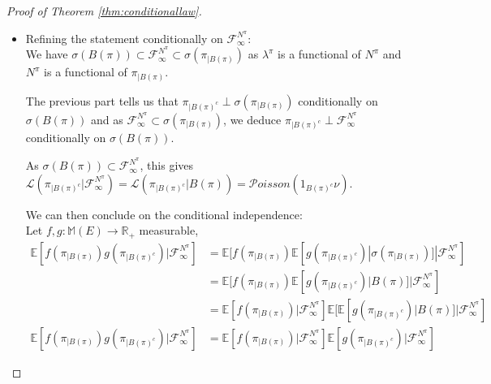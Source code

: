 \documentclass{article} %
\newcommand{\1}{\mathbbm{1}} %
\newcommand{\E}{\mathbb{E}}
\newcommand{\R}{\mathbb{R}}
\begin{document}
\begin{as}
\begin{proof}[Proof of Theorem \ref{thm:conditionallaw}]
\begin{itemize}
            This provides the conditional expectation $\E[f(\pi_{|B(\pi)})g(\pi_{|B(\pi)^c})|\sigma(B(\pi))] = \E[f(\pi_{|B(\pi)}) g(\pi'_{|B(\pi)^c})|\sigma(B(\pi))]$.

            $\pi_{|B(\pi)}$ and $\pi_{|B(\pi)^c}$ are thus independent conditionally on $B(\pi)$ and as $\pi, \pi'$ are independent, $\mathcal{L}(\pi_{|B(\pi)^c}|B(\pi)) = \mathcal{L}(\pi'_{|B(\pi)^c}|B(\pi)) = \mathcal{P}oisson(1_{B(\pi)^c} \nu)$.

            \item Refining the statement conditionally on $\mathcal{F}^{N^\pi}_\infty$:\\
            We have $\sigma(B(\pi)) \subset \mathcal{F}^{N^\pi}_\infty \subset \sigma(\pi_{|B(\pi)})$ as $\lambda^\pi$ is a functional of $N^\pi$ and $N^\pi$ is a functional of $\pi_{|B(\pi)}$.

            The previous part tells us that $\pi_{|B(\pi)^c} \perp \sigma(\pi_{|B(\pi)})$ conditionally on $\sigma(B(\pi))$ and as $\mathcal{F}^{N^\pi}_\infty \subset \sigma(\pi_{|B(\pi)})$, we deduce $\pi_{|B(\pi)^c} \perp \mathcal{F}^{N^\pi}_\infty$ conditionally on $\sigma(B(\pi))$.

            As $\sigma(B(\pi))\subset \mathcal{F}^{N^\pi}_\infty$, this gives $\mathcal{L}(\pi_{|B(\pi)^c}|\mathcal{F}^{N^\pi}_\infty) = \mathcal{L}(\pi_{|B(\pi)^c}|B(\pi)) = \mathcal{P}oisson(1_{B(\pi)^c} \nu)$.

            We can then conclude on the conditional independence:\\
            Let $f,g: \mathbb{M}(E) \to \R_+$ measurable,
            \begin{align*}
                \E[f(\pi_{|B(\pi)}) g(\pi_{|B(\pi)^c}) | \mathcal{F}^{N^\pi}_\infty] &= \E[f(\pi_{|B(\pi)}) \E[g(\pi_{|B(\pi)^c})|\sigma(\pi_{|B(\pi)})]|\mathcal{F}^{N^\pi}_\infty] \\
                &= \E[f(\pi_{|B(\pi)}) \E[g(\pi_{|B(\pi)^c})|B(\pi)]|\mathcal{F}^{N^\pi}_\infty] \\
                &= \E[f(\pi_{|B(\pi)})|\mathcal{F}^{N^\pi}_\infty] \E[\E[g(\pi_{|B(\pi)^c})|B(\pi)]|\mathcal{F}^{N^\pi}_\infty] \\
                \E[f(\pi_{|B(\pi)}) g(\pi_{|B(\pi)^c}) | \mathcal{F}^{N^\pi}_\infty] &= \E[f(\pi_{|B(\pi)})|\mathcal{F}^{N^\pi}_\infty] \E[g(\pi_{|B(\pi)^c})|\mathcal{F}^{N^\pi}_\infty]
            \end{align*}
        \end{itemize}


\end{proof}
\end{as}
\end{document}

